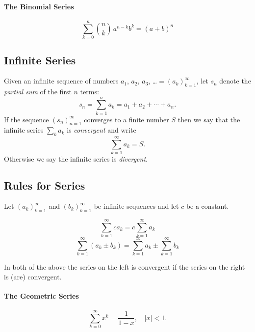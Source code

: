 \documentclass[captions=tableheading]{scrbook}
\begin{document}
\paragraph*{The Binomial Series}
\begin{equation}
\sum_{k=0}^{n}{n \choose k}\, a^{n-k}b^{k}=(a+b)^{n}\label{eq:binom-series}
\end{equation}
\subsection{Infinite Series}
\label{sec-21-3-2}


Given an infinite sequence of numbers \(a_{1}\), \(a_{2}\), \(a_{3}\), \ldots{}\(=\left(a_{k}\right)_{k=1}^{\infty}\), let \(s_{n}\) denote the \emph{partial sum} of the first \(n\) terms:
\begin{equation}
s_{n}=\sum_{k=1}^{n}a_{k}=a_{1}+a_{2}+\cdots+a_{n}.
\end{equation}
If the sequence \(\left(s_{n}\right)_{n=1}^{\infty}\) converges to a finite number \(S\) then we say that the infinite series \(\sum_{k}a_{k}\) is \emph{convergent} and write
\begin{equation}
\sum_{k=1}^{\infty}a_{k}=S.
\end{equation}
Otherwise we say the infinite series is \emph{divergent}.
\subsection{Rules for Series}
\label{sec-21-3-3}


Let \(\left(a_{k}\right)_{k=1}^{\infty}\) and \(\left(b_{k}\right)_{k=1}^{\infty}\) be infinite sequences and let \(c\) be a constant.

\begin{equation}
\sum_{k=1}^{\infty}ca_{k}=c\sum_{k=1}^{\infty}a_{k}
\end{equation}
\begin{equation}
\sum_{k=1}^{\infty}(a_{k}\pm b_{k})=\sum_{k=1}^{\infty}a_{k}\pm\sum_{k=1}^{\infty}b_{k}
\end{equation}

In both of the above the series on the left is convergent if the series on the right is (are) convergent.

\paragraph*{The Geometric Series}
\begin{equation}
\sum_{k=0}^{\infty} x^{k} = \frac{1}{1 - x},\quad|x| < 1.\label{eq:geom-series}
\end{equation}
\end{document}
